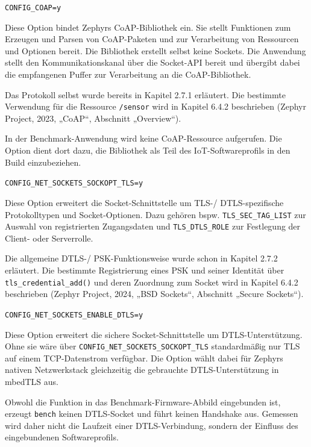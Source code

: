 \lstinline[style=fileinline]|CONFIG_COAP=y|

Diese Option bindet Zephyrs CoAP-Bibliothek ein. Sie stellt Funktionen zum Erzeugen und Parsen von CoAP-Paketen und zur Verarbeitung von Ressourcen und Optionen bereit. Die Bibliothek erstellt selbst keine Sockets. Die Anwendung stellt den Kommunikationskanal über die Socket-API bereit und übergibt dabei die empfangenen Puffer zur Verarbeitung an die CoAP-Bibliothek.

Das Protokoll selbst wurde bereits in Kapitel 2.7.1 erläutert. Die bestimmte Verwendung für die Ressource \lstinline[style=fileinline]|/sensor| wird in Kapitel 6.4.2 beschrieben (Zephyr Project, 2023, „CoAP“, Abschnitt „Overview“).

In der Benchmark-Anwendung wird keine CoAP-Ressource aufgerufen. Die Option dient dort dazu, die Bibliothek als Teil des IoT-Softwareprofils in den Build einzubeziehen.

\lstinline[style=fileinline]|CONFIG_NET_SOCKETS_SOCKOPT_TLS=y|

Diese Option erweitert die Socket-Schnittstelle um TLS-/ DTLS-spezifische Protokolltypen und Socket-Optionen. Dazu gehören bspw. \lstinline[style=fileinline]|TLS_SEC_TAG_LIST| zur Auswahl von registrierten Zugangsdaten und \lstinline[style=fileinline]|TLS_DTLS_ROLE| zur Festlegung der Client- oder Serverrolle.

Die allgemeine DTLS-/ PSK-Funktionsweise wurde schon in Kapitel 2.7.2 erläutert. Die bestimmte Registrierung eines PSK und seiner Identität über \lstinline[style=fileinline]|tls_credential_add()| und deren Zuordnung zum Socket wird in Kapitel 6.4.2 beschrieben (Zephyr Project, 2024, „BSD Sockets“, Abschnitt „Secure Sockets“).

\lstinline[style=fileinline]|CONFIG_NET_SOCKETS_ENABLE_DTLS=y|

Diese Option erweitert die sichere Socket-Schnittstelle um DTLS-Unterstützung. Ohne sie wäre über \lstinline[style=fileinline]|CONFIG_NET_SOCKETS_SOCKOPT_TLS| standardmäßig nur TLS auf einem TCP-Datenstrom verfügbar. Die Option wählt dabei für Zephyrs nativen Netzwerkstack gleichzeitig die gebrauchte DTLS-Unterstützung in mbedTLS aus.

Obwohl die Funktion in das Benchmark-Firmware-Abbild eingebunden ist, erzeugt \lstinline[style=fileinline]|bench| keinen DTLS-Socket und führt keinen Handshake aus. Gemessen wird daher nicht die Laufzeit einer DTLS-Verbindung, sondern der Einfluss des eingebundenen Softwareprofils.

